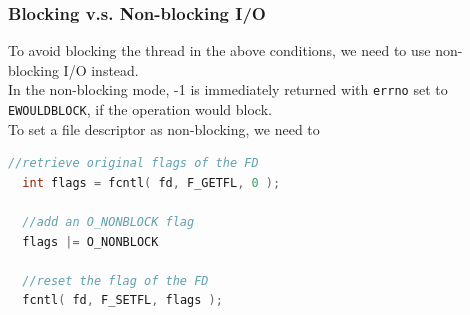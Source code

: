 \documentclass[aspectratio=43]{beamer}
\begin{document}
\begin{frame}[fragile]
  \frametitle{Blocking v.s. Non-blocking I/O}

\hspace*{2em} \begin{minipage}{.8\textwidth}
To avoid blocking the thread in the above conditions, we need to use non-blocking I/O instead.\\[1em]
In the non-blocking mode, -1 is immediately returned with {\tt errno} set to {\tt EWOULDBLOCK}, if the operation would block.\\[1em]
To set a file descriptor as non-blocking, we need to 
  \begin{lstlisting}[language=C++,basicstyle=\ttfamily\footnotesize,commentstyle=\color{commgreen},keywordstyle=\color{blue},breaklines=true]
  //retrieve original flags of the FD
  int flags = fcntl( fd, F_GETFL, 0 );
  
  //add an O_NONBLOCK flag
  flags |= O_NONBLOCK
  
  //reset the flag of the FD
  fcntl( fd, F_SETFL, flags );
  \end{lstlisting}

\end{minipage}
\end{frame}
\end{document}
